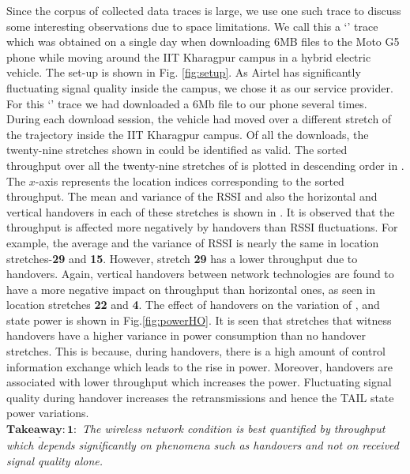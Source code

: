 \indent  Since the corpus of collected data traces is large, we use one such trace to discuss some interesting observations due to space limitations. We call this a `' trace which was obtained on a single day when downloading 6MB files to the Moto G5 phone while moving around the IIT Kharagpur campus in a hybrid electric vehicle. The set-up is shown in Fig. \ref{fig:setup}. As Airtel has significantly fluctuating signal quality inside the campus, we chose it as our service provider.  For this `' trace we had downloaded a 6Mb file to our phone several times. During each download session, the vehicle had moved over a different stretch of the trajectory inside the IIT Kharagpur campus.  Of all the downloads, the twenty-nine stretches  shown in \fig{\ref{fig:technology_with_traj}} could be identified as valid. The sorted throughput over all the twenty-nine stretches of  \fig{\ref{fig:technology_with_traj}} is plotted in descending order in \fig{\ref{fig:thptHO}}. The $x$-axis represents the location indices corresponding to the sorted throughput. The mean and variance of the \ac{RSSI} and also the horizontal and vertical handovers in each of these stretches is shown in \fig{\ref{fig:thptHO}}.  It is observed that the throughput is affected more negatively by handovers than \ac{RSSI} fluctuations. For example, the average and the variance of \ac{RSSI} is nearly the same  in location stretches-\textbf{29} and \textbf{15}. However, stretch \textbf{29} has a lower throughput due to handovers. Again, vertical handovers between network technologies  are found to have a more negative impact on throughput than horizontal ones, as seen in location stretches {\bf 22}  and {\bf 4}.  The effect of handovers on the variation of ,  and  state power is shown in Fig.\ref{fig:powerHO}. It is seen that stretches that witness handovers have a higher variance in  power consumption than no handover stretches. This is because, during handovers, there is a high amount of control information exchange which leads to the rise in  power. Moreover, handovers are associated with lower throughput which increases the  power. Fluctuating signal quality during handover increases the retransmissions and hence the TAIL state power variations. \\
$\mathrm{\mathbf{\underline{Takeaway:1}}}:$ \textit{The wireless network condition is best quantified by throughput which depends  significantly on phenomena such as handovers and not  on received signal quality alone.}\\
